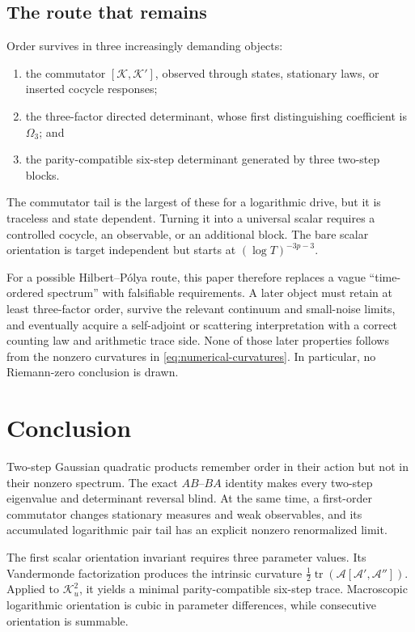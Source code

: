 \documentclass[11pt]{article}
\theoremstyle{definition}
\theoremstyle{remark}
\newcommand{\cK}{\mathcal K}
\newcommand{\cA}{\mathcal A}
\newcommand{\tr}{\operatorname{tr}}
\begin{document}
\subsection{The route that remains}

Order survives in three increasingly demanding objects:
\begin{enumerate}[label=(\roman*),leftmargin=2.2em]
 \item the commutator $[\cK,\cK']$, observed through states, stationary laws,
 or inserted cocycle responses;
 \item the three-factor directed determinant, whose first distinguishing
 coefficient is $\Omega_3$; and
 \item the parity-compatible six-step determinant generated by three
 two-step blocks.
\end{enumerate}
The commutator tail is the largest of these for a logarithmic drive, but it is
traceless and state dependent.  Turning it into a universal scalar requires a
controlled cocycle, an observable, or an additional block.  The bare scalar
orientation is target independent but starts at $(\log T)^{-3p-3}$.

For a possible Hilbert--P\'olya route, this paper therefore replaces a vague
``time-ordered spectrum'' with falsifiable requirements.  A later object must
retain at least three-factor order, survive the relevant continuum and
small-noise limits, and eventually acquire a self-adjoint or scattering
interpretation with a correct counting law and arithmetic trace side.  None
of those later properties follows from the nonzero curvatures in
\eqref{eq:numerical-curvatures}.  In particular, no Riemann-zero conclusion is
drawn.

\section{Conclusion}

Two-step Gaussian quadratic products remember order in their action but not
in their nonzero spectrum.  The exact $AB$--$BA$ identity makes every
two-step eigenvalue and determinant reversal blind.  At the same time, a
first-order commutator changes stationary measures and weak observables, and
its accumulated logarithmic pair tail has an explicit nonzero renormalized
limit.

The first scalar orientation invariant requires three parameter values.  Its
Vandermonde factorization produces the intrinsic curvature
$\frac12\tr(\cA[\cA',\cA''])$.  Applied to $\cK_u^2$, it yields a minimal
parity-compatible six-step trace.  Macroscopic logarithmic orientation is
cubic in parameter differences, while consecutive orientation is summable.
\end{document}
